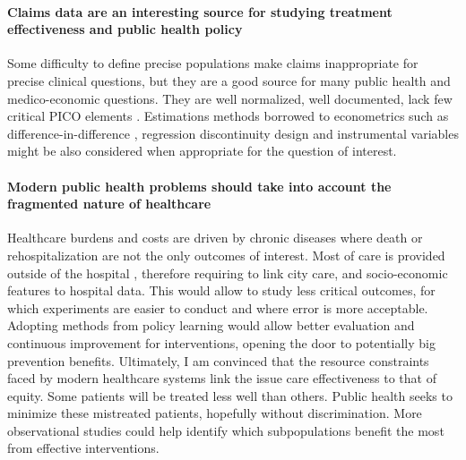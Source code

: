 \documentclass[french,12pt,twoside,a4paper]{book}
\begin{document}
\paragraph{Claims data are an interesting source for studying treatment
  effectiveness and public health policy} Some difficulty to define precise
populations make claims inappropriate for precise clinical questions, but they
are a good source for many public health and medico-economic questions. They
are well normalized, well documented, lack few critical PICO elements
\citep{caruana2023administrative}. Estimations methods borrowed to
econometrics such as difference-in-difference \citep{athey2006identification},
regression discontinuity design \citep{bor2014regression} and instrumental
variables \citep{greenland2000introduction} might be also considered when
appropriate for the question of interest.

%
\paragraph{Modern public health problems should take into account the fragmented
  nature of healthcare} Healthcare burdens and costs are driven by chronic
diseases where death or rehospitalization are not the only outcomes of
interest. Most of care is provided outside of the hospital
\citep{white1961ecology}, therefore requiring to link city care, and
socio-economic features to hospital data. This would allow to study less
critical outcomes, for which experiments are easier to conduct and where error
is more acceptable. Adopting methods from policy learning
\citep{athey2021policy} would allow better evaluation and continuous
improvement for interventions, opening the door to potentially big prevention
benefits.
%
Ultimately, I am convinced that the resource constraints faced by modern
healthcare systems link the issue care effectiveness to that of equity. Some
patients will be treated less well than others. Public health seeks to minimize
these mistreated patients, hopefully without discrimination. More observational
studies could help identify which subpopulations benefit the most from effective
interventions.

\end{document}
